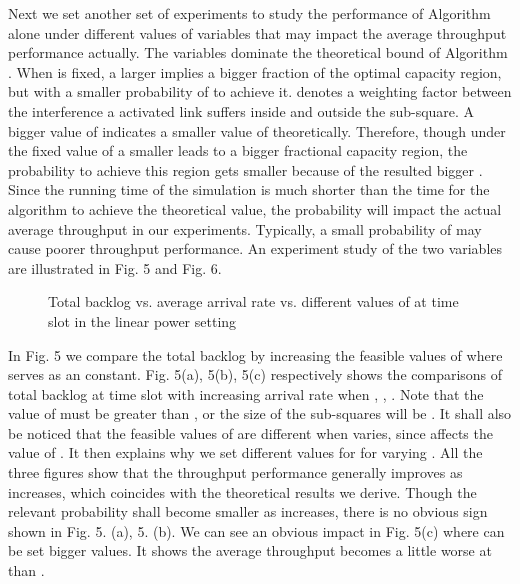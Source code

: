 \documentclass[journal]{IEEEtran}
\begin{document}
Next we set another set of experiments to study the performance of Algorithm  alone under different values of variables that may impact the average throughput performance actually. The variables  dominate the theoretical bound of Algorithm . When  is fixed, a larger  implies a bigger fraction of the optimal capacity region, but with a smaller probability of  to achieve it.   denotes a weighting factor between the interference a activated link suffers inside and outside the sub-square. A bigger value of  indicates a smaller value of  theoretically. Therefore, though under the fixed value of  a smaller   leads to a bigger fractional capacity region, the probability to achieve this region gets smaller because of the resulted bigger . Since the running time of the simulation is much shorter than the time for the algorithm to achieve the theoretical value, the probability will impact the actual average throughput in our experiments. Typically, a small probability of  may cause poorer throughput performance. An  experiment study of the two variables are illustrated in Fig. 5 and Fig. 6.

\begin{figure*}[htpb]
    \centering
    \hspace{0cm}
    \hspace{0cm}
    \captionsetup{justification=centering}
     \caption{{\small{Total backlog vs. average arrival rate  vs. different values of   at time slot  in the linear power setting}}}
\vspace*{-1\baselineskip}
\end{figure*}

In Fig. 5 we compare the total backlog by increasing the feasible values of  where  serves as an constant. Fig. 5(a), 5(b), 5(c) respectively shows the comparisons of total backlog at time slot  with increasing arrival rate when , , . Note that the value of  must be greater than , or the size of the sub-squares will be . It shall also be noticed that the feasible values of  are different when  varies, since  affects the value of . It then explains why we set different values for  for varying .
All the three figures show that the throughput performance generally improves as  increases, which coincides with the theoretical results we derive. Though the relevant probability shall become smaller as  increases, there is no obvious sign shown in Fig. 5. (a), 5. (b). We can see an obvious impact in Fig. 5(c) where  can be set bigger values. It shows the average throughput becomes a little worse at  than .
\end{document}
